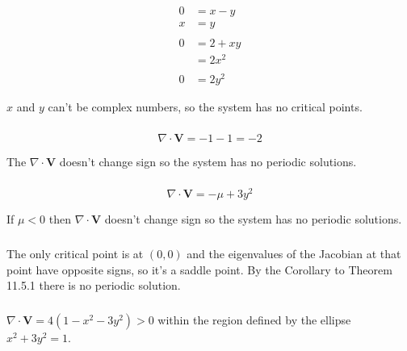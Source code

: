 \documentclass{article}
\begin{document}
\begin{align*}
  0 & = x - y   \\
  x & = y       \\ \\
  0 & = 2 + x y \\
    & = 2 x^2   \\ \\
  0 & = 2 y^2
\end{align*}

$x$ and $y$ can't be complex numbers, so the system has no critical points.

\setcounter{subsubsection}{2}
\subsubsection{}

\[\nabla \cdot \mathbf{V} = -1 - 1 = -2\]

The $\nabla \cdot \mathbf{V}$ doesn't change sign so the system has no periodic solutions.

\setcounter{subsubsection}{4}
\subsubsection{}

\[\nabla \cdot \mathbf{V} = -\mu + 3 y^2\]

If $\mu < 0$ then $\nabla \cdot \mathbf{V}$ doesn't change sign so the system has no periodic solutions.

\setcounter{subsubsection}{6}
\subsubsection{}

The only critical point is at $(0, 0)$ and the eigenvalues of the Jacobian at that point have opposite signs, so it's a saddle point. By the Corollary to Theorem 11.5.1 there is no periodic solution.

\setcounter{subsubsection}{10}
\subsubsection{}

$\nabla \cdot \mathbf{V} = 4 (1 - x^2 - 3 y^2) > 0$ within the region defined by the ellipse $x^2 + 3 y^2 = 1$.

\setcounter{subsubsection}{14}
\subsubsection{}
\end{document}
